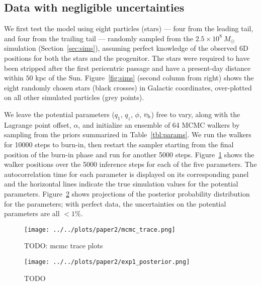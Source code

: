 \documentclass[letterpaper,12pt,preprint]{aastex}
\newcommand{\Loffset}{\alpha}
\newcommand{\vhalo}{v_{\rm h}}
\begin{document}
\subsection{Data with negligible uncertainties}

We first test the model using eight particles (stars) --- four from the leading tail, and four from the trailing tail --- randomly sampled from the $2.5\times10^8~M_\odot$ simulation (Section~\ref{sec:sims}), assuming perfect knowledge of the observed 6D positions for both the stars and the progenitor. The stars were required to have been stripped after the first pericentric passage and have a present-day distance within $50$ kpc of the Sun. Figure~\ref{fig:sims} (second column from right) shows the eight randomly chosen stars (black crosses) in Galactic coordinates, over-plotted on all other simulated particles (grey points). 

We leave the potential parameters ($q_1$, $q_z$, $\phi$, $\vhalo$) free to vary, along with the Lagrange point offset, $\Loffset$, and initialize an ensemble of 64 MCMC walkers by sampling from the priors summarized in Table~\ref{tbl:params}. We run the walkers for 10000 steps to burn-in, then restart the sampler starting from the final position of the burn-in phase and run for another 5000 steps. Figure~\ref{fig:trace} shows the walker positions over the 5000 inference steps for each of the five parameters. The autocorrelation time for each parameter is displayed on its corresponding panel and the horizontal lines indicate the true simulation values for the potential parameters. Figure~\ref{fig:exp1_posterior} shows projections of the posterior probability distribution for the parameters; with perfect data, the uncertainties on the potential parameters are all $<1\%$.

\begin{figure}[!ht]
\begin{center}
\texttt{[image: ../../plots/paper2/mcmc\_trace.png]}
\caption{ TODO: mcmc trace plots  }\label{fig:trace}
\end{center}
\end{figure}

\begin{figure}[!ht]
\begin{center}
\texttt{[image: ../../plots/paper2/exp1\_posterior.png]}
\caption{ TODO  }\label{fig:exp1_posterior}
\end{center}
\end{figure}
\end{document}
